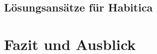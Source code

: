 \documentclass[sigconf, nonacm]{acmart}
\begin{document}
\subsection{Lösungsansätze für Habitica}\label{sec:solutions_for_habitica}

\section{Fazit und Ausblick}




\end{document}
